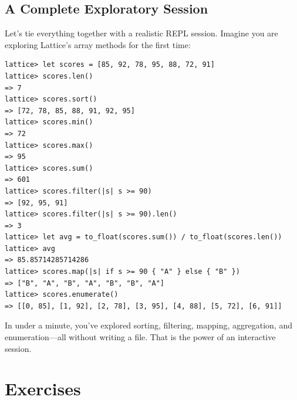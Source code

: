 \subsection{A Complete Exploratory Session}\label{subsec:complete-session}

Let's tie everything together with a realistic REPL session.
Imagine you are exploring Lattice's array methods for the first time:

\begin{lstlisting}[language=Lattice, numbers=none]
lattice> let scores = [85, 92, 78, 95, 88, 72, 91]
lattice> scores.len()
=> 7
lattice> scores.sort()
=> [72, 78, 85, 88, 91, 92, 95]
lattice> scores.min()
=> 72
lattice> scores.max()
=> 95
lattice> scores.sum()
=> 601
lattice> scores.filter(|s| s >= 90)
=> [92, 95, 91]
lattice> scores.filter(|s| s >= 90).len()
=> 3
lattice> let avg = to_float(scores.sum()) / to_float(scores.len())
lattice> avg
=> 85.85714285714286
lattice> scores.map(|s| if s >= 90 { "A" } else { "B" })
=> ["B", "A", "B", "A", "B", "B", "A"]
lattice> scores.enumerate()
=> [[0, 85], [1, 92], [2, 78], [3, 95], [4, 88], [5, 72], [6, 91]]
\end{lstlisting}

In under a minute, you've explored sorting, filtering, mapping, aggregation, and enumeration---all without writing a file.
That is the power of an interactive session.

\section{Exercises}\label{sec:ch02-exercises}

